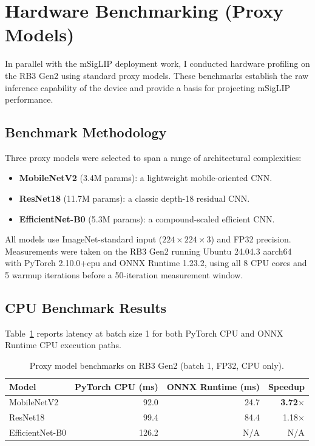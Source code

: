 \documentclass[../main.tex]{subfiles}
\begin{document}
\section{Hardware Benchmarking (Proxy Models)}
\label{sec:hardware_benchmarks}

\noindent In parallel with the mSigLIP deployment work, I conducted hardware profiling on the RB3 Gen2 using standard proxy models. These benchmarks establish the raw inference capability of the device and provide a basis for projecting mSigLIP performance.

\subsection{Benchmark Methodology}

\noindent Three proxy models were selected to span a range of architectural complexities:

\begin{itemize}
    \item \textbf{MobileNetV2} (3.4M params): a lightweight mobile-oriented CNN.
    \item \textbf{ResNet18} (11.7M params): a classic depth-18 residual CNN.
    \item \textbf{EfficientNet-B0} (5.3M params): a compound-scaled efficient CNN.
\end{itemize}

\noindent All models use ImageNet-standard input ($224 \times 224 \times 3$) and FP32 precision. Measurements were taken on the RB3 Gen2 running Ubuntu 24.04.3 aarch64 with PyTorch 2.10.0+cpu and ONNX Runtime 1.23.2, using all 8 CPU cores and 5 warmup iterations before a 50-iteration measurement window.

\subsection{CPU Benchmark Results}

\noindent Table~\ref{tab:proxy_benchmark} reports latency at batch size 1 for both PyTorch CPU and ONNX Runtime CPU execution paths.

\begin{table}[htbp]
\centering
\caption{Proxy model benchmarks on RB3 Gen2 (batch 1, FP32, CPU only).}
\label{tab:proxy_benchmark}
\renewcommand{\arraystretch}{1.3}
\begin{tabularx}{\textwidth}{Xrrr}
\toprule
\textbf{Model} & \textbf{PyTorch CPU (ms)} & \textbf{ONNX Runtime (ms)} & \textbf{Speedup} \\
\midrule
MobileNetV2     & 92.0  & 24.7 & \textbf{3.72$\times$} \\
ResNet18        & 99.4  & 84.4 & 1.18$\times$ \\
EfficientNet-B0 & 126.2 & N/A  & N/A \\
\bottomrule
\end{tabularx}
\end{table}
\end{document}
